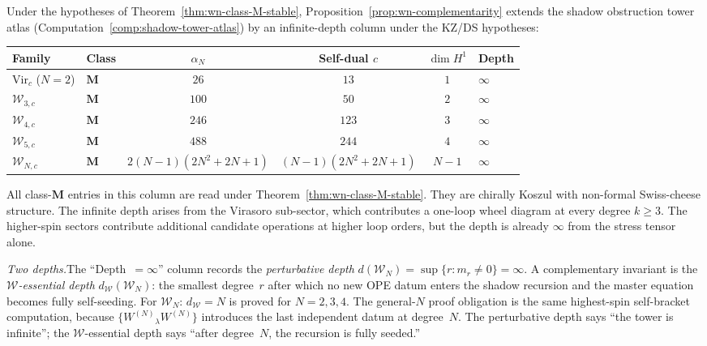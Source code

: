 \begin{remark}
\label{rem:wn-shadow-atlas}
%
Under the hypotheses of Theorem~\ref{thm:wn-class-M-stable},
Proposition~\ref{prop:wn-complementarity}
extends the shadow obstruction tower atlas
(Computation~\ref{comp:shadow-tower-atlas}) by
an infinite-depth column under the KZ/DS hypotheses:

\begin{center}
\small
\renewcommand{\arraystretch}{1.3}
\begin{tabular}{llcccl}
\toprule
\textbf{Family} & \textbf{Class}
 & $\alpha_N$ & Self-dual $c$ & $\dim H^1$ & \textbf{Depth} \\
\midrule
$\mathrm{Vir}_c$ ($N=2$) & $\mathbf{M}$
 & $26$ & $13$ & $1$ & $\infty$ \\
$\mathcal{W}_{3,c}$ & $\mathbf{M}$
 & $100$ & $50$ & $2$ & $\infty$ \\
$\mathcal{W}_{4,c}$ & $\mathbf{M}$
 & $246$ & $123$ & $3$ & $\infty$ \\
$\mathcal{W}_{5,c}$ & $\mathbf{M}$
 & $488$ & $244$ & $4$ & $\infty$ \\
$\mathcal{W}_{N,c}$ & $\mathbf{M}$
 & $2(N\!-\!1)(2N^2\!+\!2N\!+\!1)$
 & $(N\!-\!1)(2N^2\!+\!2N\!+\!1)$
 & $N\!-\!1$ & $\infty$ \\
\bottomrule
\end{tabular}
\end{center}

\noindent
All class-$\mathbf M$ entries in this column are read under
Theorem~\ref{thm:wn-class-M-stable}. They are chirally Koszul with
non-formal Swiss-cheese structure. The infinite depth arises from the
Virasoro sub-sector, which contributes a one-loop wheel diagram
at every degree $k \ge 3$. The higher-spin sectors contribute
additional candidate operations at higher loop orders,
but the depth is already $\infty$ from the stress tensor alone.

\emph{Two depths.}\enspace The ``Depth~$= \infty$'' column
records the \emph{perturbative depth}
$d(\mathcal{W}_N) = \sup\{r : m_r \ne 0\} = \infty$. A
complementary invariant is the \emph{$\mathcal{W}$-essential
depth} $d_{\mathcal{W}}(\mathcal{W}_N)$: the smallest degree~$r$
after which no new OPE datum enters the shadow recursion and the
master equation becomes fully self-seeding. For
$\mathcal{W}_N$: $d_{\mathcal{W}} = N$ is proved for
$N = 2,3,4$.  The general-$N$ proof obligation is the same
highest-spin self-bracket computation, because
$\{W^{(N)}{}_\lambda W^{(N)}\}$ introduces the last independent
datum at degree~$N$. The perturbative depth says ``the tower is
infinite''; the $\mathcal{W}$-essential depth says ``after
degree~$N$, the recursion is fully seeded.''
\end{remark}

